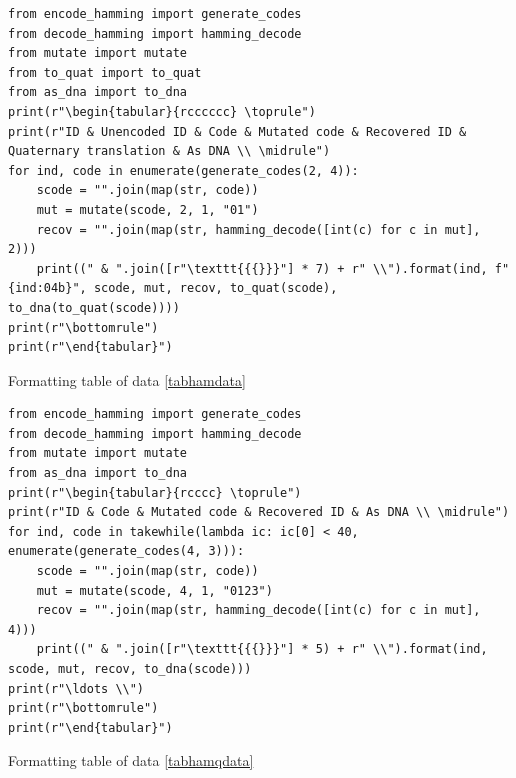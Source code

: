 \documentclass[a4paper,11pt]{article}
\newenvironment{longlisting}
{\addvspace{\baselineskip}\captionsetup{type=listing}}
{\addvspace{\baselineskip}}
\begin{document}
\begin{longlisting}
\begin{verbatim}
from encode_hamming import generate_codes
from decode_hamming import hamming_decode
from mutate import mutate
from to_quat import to_quat
from as_dna import to_dna
print(r"\begin{tabular}{rcccccc} \toprule")
print(r"ID & Unencoded ID & Code & Mutated code & Recovered ID & Quaternary translation & As DNA \\ \midrule")
for ind, code in enumerate(generate_codes(2, 4)):
    scode = "".join(map(str, code))
    mut = mutate(scode, 2, 1, "01")
    recov = "".join(map(str, hamming_decode([int(c) for c in mut], 2)))
    print((" & ".join([r"\texttt{{{}}}"] * 7) + r" \\").format(ind, f"{ind:04b}", scode, mut, recov, to_quat(scode), to_dna(to_quat(scode))))
print(r"\bottomrule")
print(r"\end{tabular}")
\end{verbatim}
\caption{Formatting table of data \ref{tabhamdata}}\label{lsthamdatatab}
\end{longlisting}

\begin{longlisting}
\begin{verbatim}
from encode_hamming import generate_codes
from decode_hamming import hamming_decode
from mutate import mutate
from as_dna import to_dna
print(r"\begin{tabular}{rcccc} \toprule")
print(r"ID & Code & Mutated code & Recovered ID & As DNA \\ \midrule")
for ind, code in takewhile(lambda ic: ic[0] < 40, enumerate(generate_codes(4, 3))):
    scode = "".join(map(str, code))
    mut = mutate(scode, 4, 1, "0123")
    recov = "".join(map(str, hamming_decode([int(c) for c in mut], 4)))
    print((" & ".join([r"\texttt{{{}}}"] * 5) + r" \\").format(ind, scode, mut, recov, to_dna(scode)))
print(r"\ldots \\")
print(r"\bottomrule")
print(r"\end{tabular}")
\end{verbatim}
\caption{Formatting table of data \ref{tabhamqdata}}\label{lsthamqdatatab}
\end{longlisting}
\end{document}
